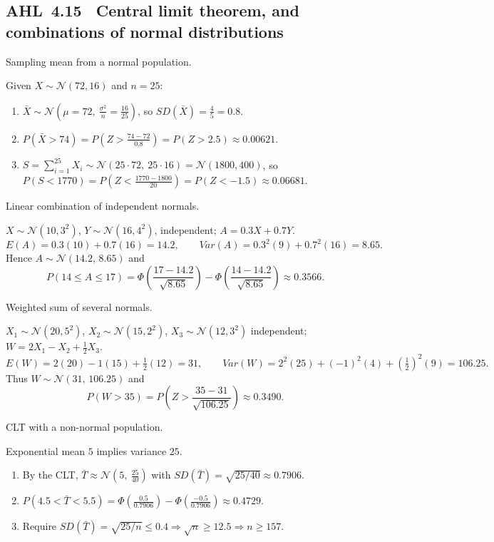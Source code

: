 \documentclass[11pt]{article}
\def\textbf#1{#1}%
\def\mathbb#1{#1}%
\def\mathrm#1{#1}%
\newcommand{\tocsubsection}[1]{\subsection{#1}}
\begin{document}
\tocsubsection{AHL 4.15 \; Central limit theorem, and combinations of normal distributions}


\begin{solution}
\textbf{Sampling mean from a normal population.}

Given $X\sim\mathcal N(72,16)$ and $n=25$:
\begin{enumerate}
  \item $\displaystyle \bar X\sim\mathcal N\!\left(\mu=72,\ \frac{\sigma^2}{n}=\frac{16}{25}\right)$, so $\mathrm{SD}(\bar X)=\frac{4}{5}=0.8$.
  \item $P(\bar X>74)=P\!\left(Z>\frac{74-72}{0.8}\right)=P(Z>2.5)\approx \boxed{0.00621}$.
  \item $S=\sum_{i=1}^{25}X_i\sim\mathcal N(25\cdot72,\ 25\cdot16)=\mathcal N(1800,400)$, so
        $P(S<1770)=P\!\left(Z<\frac{1770-1800}{20}\right)=P(Z<-1.5)\approx \boxed{0.06681}$.
\end{enumerate}
\end{solution}

\begin{solution}
\textbf{Linear combination of independent normals.}

$X\sim\mathcal N(10,3^2)$, $Y\sim\mathcal N(16,4^2)$, independent; $A=0.3X+0.7Y$.
\[
\mathbb E(A)=0.3(10)+0.7(16)=\boxed{14.2},\qquad
\mathrm{Var}(A)=0.3^2(9)+0.7^2(16)=\boxed{8.65}.
\]
Hence $A\sim\mathcal N(14.2,\,8.65)$ and
\[
P(14\le A\le 17)=\Phi\!\left(\frac{17-14.2}{\sqrt{8.65}}\right)
               -\Phi\!\left(\frac{14-14.2}{\sqrt{8.65}}\right)\approx \boxed{0.3566}.
\]
\end{solution}

\begin{solution}
\textbf{Weighted sum of several normals.}

$X_1\sim\mathcal N(20,5^2)$, $X_2\sim\mathcal N(15,2^2)$, $X_3\sim\mathcal N(12,3^2)$ independent; $W=2X_1-X_2+\tfrac12 X_3$.
\[
\mathbb E(W)=2(20)-1(15)+\tfrac12(12)=\boxed{31},\qquad
\mathrm{Var}(W)=2^2(25)+(-1)^2(4)+\left(\tfrac12\right)^2(9)=\boxed{106.25}.
\]
Thus $W\sim\mathcal N(31,\,106.25)$ and
\[
P(W>35)=P\!\left(Z>\frac{35-31}{\sqrt{106.25}}\right)\approx \boxed{0.3490}.
\]
\end{solution}

\begin{solution}
\textbf{CLT with a non-normal population.}

Exponential mean $5$ implies variance $25$.
\begin{enumerate}
  \item By the CLT, $\displaystyle \bar T\approx \mathcal N\!\left(5,\ \frac{25}{40}\right)$ with $\mathrm{SD}(\bar T)=\sqrt{25/40}\approx 0.7906$.
  \item $P(4.5<\bar T<5.5)=\Phi\!\left(\frac{0.5}{0.7906}\right)-\Phi\!\left(\frac{-0.5}{0.7906}\right)\approx \boxed{0.4729}$.
  \item Require $\mathrm{SD}(\bar T)=\sqrt{25/n}\le 0.4\Rightarrow \sqrt n\ge 12.5\Rightarrow n\ge \boxed{157}$.
\end{enumerate}
\end{solution}
\end{document}
